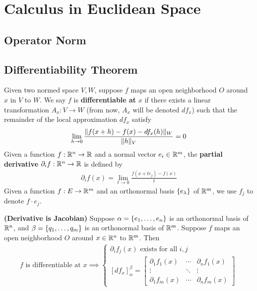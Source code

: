 \documentclass{report}
\begin{document}
\chapter{Calculus in Euclidean Space}
\section{Operator Norm}

\section{Differentiability Theorem}
\begin{mdframed}


Given two normed space $V,W$, suppose $f$ maps an open neighborhood $O$ around $x$ in $V$ to $W$. We say $f$ is \textbf{differentiable at} $x$ if there exists a linear transformation $A_x:V\rightarrow W$ (from now, $A_x$ will be denoted $df_x$) such that the remainder of the local approximation $df_x$ satisfy 
\begin{align*}
  \lim_{h\to 0} \frac{\| f(x+h)-f(x)-df_x(h) \|_W}{\| h \|_V}=0
\end{align*}
Given a function $f:\mathbb{R}^n \to \mathbb{R}$ and a normal vector $e_i\in\mathbb{R}^m$, the \textbf{partial derivative} $\partial_if:\mathbb{R}^n \to \mathbb{R}$ is defined by 
\begin{align*}
\partial_i f(x)=\lim_{t\to 0} \frac{f(x+te_j)-f(x)}{t}
\end{align*}
Given a function $f:E\rightarrow \mathbb{R}^m$ and an orthonormal basis $\{ e_\lambda \}$ of $\mathbb{R}^m$, we use  $f_j$ to denote $f\cdot e_j $.


\end{mdframed}
\begin{theorem}
\label{DiJ}
\textbf{(Derivative is Jacobian)} Suppose  $\alpha =\{ e_1,\dots ,e_n \}$ is an orthonormal basis of $\mathbb{R}^n$, and $\beta =\{ q_1,\dots ,q_m \}$ is an orthonormal basis of  $\mathbb{R}^m$. Suppose  $f$ maps an open neighborhood $O$ around $x\in\mathbb{R}^n$ to $\mathbb{R}^m$.  Then 
\begin{align*}
  f\text{ is differentiable at }x\implies \begin{cases}
    \partial_{i}f_j(x)\text{ exists for all }i,j\\
    [df_x]_{\alpha }^{\beta }=\begin{bmatrix}
      \partial_1f_1(x)&\cdots & \partial_nf_1(x)\\
      \vdots & \ddots & \vdots\\
      \partial_1f_m(x) & \cdots & \partial_nf_m(x)
    \end{bmatrix}
  \end{cases}
\end{align*}
\end{theorem}
\end{document}
